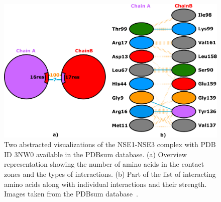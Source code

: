 \documentclass{bmcart}
\begin{document}
\begin{backmatter}
\begin{figure}[h!]
  \centering	
  \includegraphics[width=0.9\columnwidth]{images/figure2.pdf}
  \caption{
    Two abstracted visualizations of the NSE1-NSE3 complex with PDB ID 3NW0 available in the PDBsum database. (a) Overview representation showing the number of amino acids in the contact zones and the types of interactions. (b) Part of the list of interacting amino acids along with individual interactions and their strength. Images taken from the PDBsum database~\cite{pdbsum}.}
    \label{fig:pdbsum}
\end{figure}


\end{backmatter}
\end{document}
